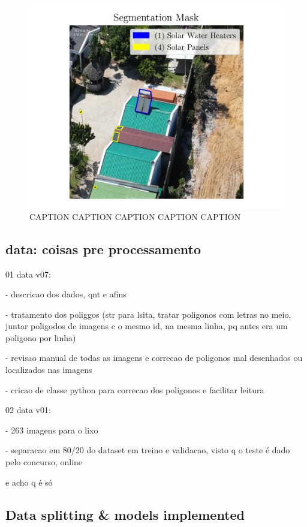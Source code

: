 \documentclass[conference]{IEEEtran}
\begin{document}
\begin{figure}[H]
    \centering
    \includegraphics[width=1\linewidth]{assets/data_segmentation_mask.png}
    \caption{CAPTION CAPTION CAPTION CAPTION CAPTION}
    \label{fig:data_segmentation_mask}
\end{figure}

\subsection{data: coisas pre processamento}

01 data v07:

- descricao dos dados, qnt e afins

- tratamento dos poliggos (str para lsita, tratar poligonos com letras no meio, juntar poligodos de imagens c o mesmo id, na mesma linha, pq antes era um poligono por linha)

- revisao manual de todas as imagens e correcao de poligonos mal desenhados ou localizados nas imagens

- cricao de classe python para correcao dos poligonos e facilitar leitura

02 data v01:

- 263 imagens para o lixo

- separacao em 80/20 do dataset em treino e validacao, visto q o teste é dado pelo concurso, online

e acho q é só


\subsection{Data splitting \& models implemented}
\end{document}
